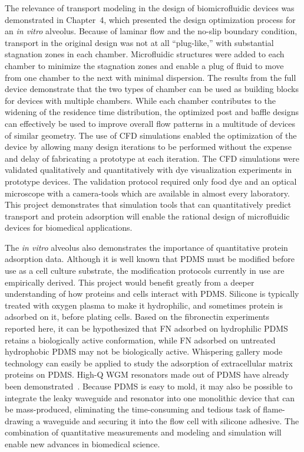 The relevance of transport modeling in the design of biomicrofluidic
devices was demonstrated in Chapter~4, which presented the design
optimization process for an \emph{in vitro} alveolus. Because of laminar
flow and the no-slip boundary condition, transport in the original
design was not at all {}``plug-like,'' with substantial stagnation
zones in each chamber. Microfluidic structures were added to each
chamber to minimize the stagnation zones and enable a plug of fluid
to move from one chamber to the next with minimal dispersion. The
results from the full device demonstrate that the two types of chamber
can be used as building blocks for devices with multiple chambers.
While each chamber contributes to the widening of the residence time
distribution, the optimized post and baffle designs can effectively
be used to improve overall flow patterns in a multitude of devices
of similar geometry. The use of CFD simulations enabled the optimization
of the device by allowing many design iterations to be performed without
the expense and delay of fabricating a prototype at each iteration.
The CFD simulations were validated qualitatively and quantitatively
with dye visualization experiments in prototype devices. The validation
protocol required only food dye and an optical microscope with a camera\nobreakdash-tools
which are available in almost every laboratory. This project demonstrates
that simulation tools that can quantitatively predict transport and
protein adsorption will enable the rational design of microfluidic
devices for biomedical applications.

The \emph{in vitro} alveolus also demonstrates the importance of quantitative
protein adsorption data. Although it is well known that PDMS must
be modified before use as a cell culture substrate, the modification
protocols currently in use are empirically derived. This project would
benefit greatly from a deeper understanding of how proteins and cells
interact with PDMS. Silicone is typically treated with oxygen plasma
to make it hydrophilic, and sometimes protein is adsorbed on it, before
plating cells. Based on the fibronectin experiments reported here,
it can be hypothesized that FN adsorbed on hydrophilic PDMS retains
a biologically active conformation, while FN adsorbed on untreated
hydrophobic PDMS may not be biologically active. Whispering gallery
mode technology can easily be applied to study the adsorption of extracellular
matrix proteins on PDMS. High-Q WGM resonators made out of PDMS have
already been demonstrated~\cite{Martin2004}. Because PDMS is easy
to mold, it may also be possible to integrate the leaky waveguide
and resonator into one monolithic device that can be mass-produced,
eliminating the time-consuming and tedious task of flame-drawing a
waveguide and securing it into the flow cell with silicone adhesive.
The combination of quantitative measurements and modeling and simulation
will enable new advances in biomedical science.
